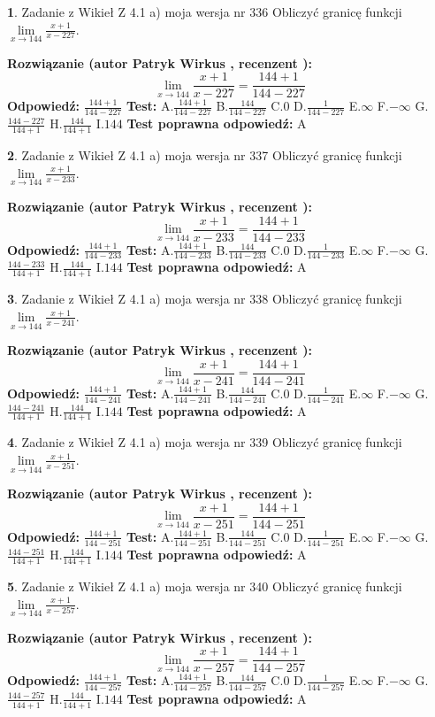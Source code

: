 \documentclass[12pt, a4paper]{article}
\theoremstyle{definition} %
\newtheorem{zad}{}
\newcommand{\zadStart}[1]{\begin{zad}#1\newline}
\newcommand{\zadStop}{\end{zad}}
\newcommand{\rozwStart}[2]{\noindent \textbf{Rozwiązanie (autor #1 , recenzent #2): }\newline}
\newcommand{\rozwStop}{\newline}
\newcommand{\odpStart}{\noindent \textbf{Odpowiedź:}\newline}
\newcommand{\odpStop}{\newline}
\newcommand{\testStart}{\noindent \textbf{Test:}\newline}
\newcommand{\testStop}{\newline}
\newcommand{\kluczStart}{\noindent \textbf{Test poprawna odpowiedź:}\newline}
\newcommand{\kluczStop}{\newline}
\begin{document}
\zadStart{Zadanie z Wikieł Z 4.1 a) moja wersja nr 336}
Obliczyć granicę funkcji $\lim\limits_{x\to144}\frac{x+1}{x-227}$.
\zadStop
\rozwStart{Patryk Wirkus}{}
$$\lim\limits_{x\to144}\frac{x+1}{x-227} = \frac{144+1}{144-227}$$
\rozwStop
\odpStart
$\frac{144+1}{144-227}$
\odpStop
\testStart
A.$\frac{144+1}{144-227}$
B.$\frac{144}{144-227}$
C.$0$
D.$\frac{1}{144-227}$
E.$\infty$
F.$-\infty$
G.$\frac{144-227}{144+1}$
H.$\frac{144}{144+1}$
I.$144$
\testStop
\kluczStart
A
\kluczStop



\zadStart{Zadanie z Wikieł Z 4.1 a) moja wersja nr 337}
Obliczyć granicę funkcji $\lim\limits_{x\to144}\frac{x+1}{x-233}$.
\zadStop
\rozwStart{Patryk Wirkus}{}
$$\lim\limits_{x\to144}\frac{x+1}{x-233} = \frac{144+1}{144-233}$$
\rozwStop
\odpStart
$\frac{144+1}{144-233}$
\odpStop
\testStart
A.$\frac{144+1}{144-233}$
B.$\frac{144}{144-233}$
C.$0$
D.$\frac{1}{144-233}$
E.$\infty$
F.$-\infty$
G.$\frac{144-233}{144+1}$
H.$\frac{144}{144+1}$
I.$144$
\testStop
\kluczStart
A
\kluczStop



\zadStart{Zadanie z Wikieł Z 4.1 a) moja wersja nr 338}
Obliczyć granicę funkcji $\lim\limits_{x\to144}\frac{x+1}{x-241}$.
\zadStop
\rozwStart{Patryk Wirkus}{}
$$\lim\limits_{x\to144}\frac{x+1}{x-241} = \frac{144+1}{144-241}$$
\rozwStop
\odpStart
$\frac{144+1}{144-241}$
\odpStop
\testStart
A.$\frac{144+1}{144-241}$
B.$\frac{144}{144-241}$
C.$0$
D.$\frac{1}{144-241}$
E.$\infty$
F.$-\infty$
G.$\frac{144-241}{144+1}$
H.$\frac{144}{144+1}$
I.$144$
\testStop
\kluczStart
A
\kluczStop



\zadStart{Zadanie z Wikieł Z 4.1 a) moja wersja nr 339}
Obliczyć granicę funkcji $\lim\limits_{x\to144}\frac{x+1}{x-251}$.
\zadStop
\rozwStart{Patryk Wirkus}{}
$$\lim\limits_{x\to144}\frac{x+1}{x-251} = \frac{144+1}{144-251}$$
\rozwStop
\odpStart
$\frac{144+1}{144-251}$
\odpStop
\testStart
A.$\frac{144+1}{144-251}$
B.$\frac{144}{144-251}$
C.$0$
D.$\frac{1}{144-251}$
E.$\infty$
F.$-\infty$
G.$\frac{144-251}{144+1}$
H.$\frac{144}{144+1}$
I.$144$
\testStop
\kluczStart
A
\kluczStop



\zadStart{Zadanie z Wikieł Z 4.1 a) moja wersja nr 340}
Obliczyć granicę funkcji $\lim\limits_{x\to144}\frac{x+1}{x-257}$.
\zadStop
\rozwStart{Patryk Wirkus}{}
$$\lim\limits_{x\to144}\frac{x+1}{x-257} = \frac{144+1}{144-257}$$
\rozwStop
\odpStart
$\frac{144+1}{144-257}$
\odpStop
\testStart
A.$\frac{144+1}{144-257}$
B.$\frac{144}{144-257}$
C.$0$
D.$\frac{1}{144-257}$
E.$\infty$
F.$-\infty$
G.$\frac{144-257}{144+1}$
H.$\frac{144}{144+1}$
I.$144$
\testStop
\kluczStart
A
\kluczStop
\end{document}
